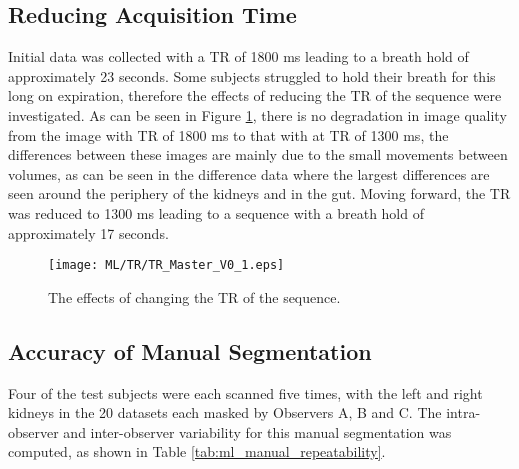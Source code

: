 \subsection{Reducing Acquisition Time}
Initial data was collected with a \ac{TR} of 1800 ms leading to a breath hold of approximately 23 seconds. Some subjects struggled to hold their breath for this long on expiration, therefore the effects of reducing the \ac{TR} of the sequence were investigated. As can be seen in Figure \ref{fig:ml_tr}, there is no degradation in image quality from the image with \ac{TR} of 1800 ms to that with at \ac{TR} of 1300 ms, the differences between these images are mainly due to the small movements between volumes, as can be seen in the difference data where the largest differences are seen around the periphery of the kidneys and in the gut. Moving forward, the \ac{TR} was reduced to 1300 ms leading to a sequence with a breath hold of approximately 17 seconds.

\begin{figure}[H]
	\centering
	\texttt{[image: ML/TR/TR\_Master\_V0\_1.eps]}
	\caption{The effects of changing the \ac{TR} of the sequence.}
	\label{fig:ml_tr}	
\end{figure}

\subsection{Accuracy of Manual Segmentation}
Four of the test subjects were each scanned five times, with the left and right kidneys in the 20 datasets each masked by Observers A, B and C. The intra-observer and inter-observer variability for this manual segmentation was computed, as shown in Table \ref{tab:ml_manual_repeatability}. 

